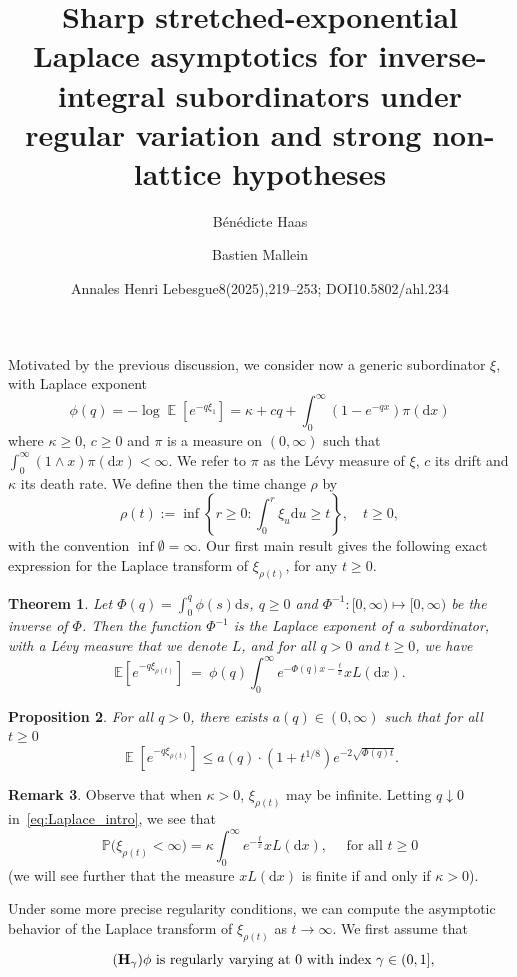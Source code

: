 \documentclass[10pt]{amsart}
\title[Sharp inverse-integral subordinator asymptotics]{Sharp stretched-exponential Laplace asymptotics for inverse-integral subordinators under regular variation and strong non-lattice hypotheses}
\author{B\'en\'edicte Haas}
\author{Bastien Mallein}
\date{Annales Henri Lebesgue8(2025),219–253; DOI10.5802/ahl.234}
\newtheorem{theo}{Theorem}[section]
\newtheorem{prop}[theo]{Proposition}
\theoremstyle{definition}
\newtheorem{rema}[theo]{Remark}
\numberwithin{equation}{section}
\newcommand{\bbP}{\mathbb{P}}
\newcommand{\bbE}{\mathbb{E}}
\DeclareMathOperator{\E}{\mathbb{E}}
\newcommand{\dd}{\mathrm{d}}
\begin{document}
\maketitle
\setcounter{section}{1}
\setcounter{theo}{1}
\setcounter{equation}{6}
Motivated by the previous discussion, we consider now a generic subordinator $\xi$, with Laplace exponent
\[
\phi(q)=-\log \E\left[e^{-q \xi_1}\right] = \kappa + c q + \int_0^\infty (1 - e^{-qx}) \pi(\dd x)
\]
where $\kappa \geq 0$, $c \geq 0$ and $\pi$ is a measure on $(0,\infty)$ such that $\int_0^{\infty} (1 \wedge x) \pi(\dd x) < \infty$. We refer to $\pi$ as the Lévy measure of $\xi$, $c$ its drift and $\kappa$ its death rate. We define then the time change $\rho$ by
\[
\rho(t) := \inf \left\{ r \geq 0 : \int_0^r \xi_u \dd u \geq t \right\}, \quad t \geq 0,
\]
with the convention $\inf{\emptyset}=\infty$. Our first main result gives the following exact expression for the Laplace transform of $\xi_{\rho(t)}$, for any $t\geq 0$.
\begin{theo}\label{thm:lapTransform}
Let $\Phi(q)=\int_0^q \phi(s) \dd s$, $q \geq 0$ and $\Phi^{-1}: [0,\infty) \mapsto [0,\infty)$ be the inverse of $\Phi$. Then the function $\Phi^{-1}$ is the Laplace exponent of a subordinator, with a Lévy measure that we denote $L$, and for all $q > 0$ and $t \geq 0$, we have
\begin{equation}\label{eq:Laplace_intro}
\bbE\left[e^{-q\xi_{\rho(t)}}\right]~=~\phi(q)\int_0^{\infty} e^{-\Phi(q)x-\frac{t}{x}} xL(\dd x).
\end{equation}
\end{theo}
\begin{prop}\label{prop:unifBound}
For all $q > 0$, there exists $a(q) \in (0,\infty)$ such that for all $t \geq 0$
\[
\E\left[e^{-q \xi_{\rho(t)}} \right] \leq a(q) \cdot \left(1+t^{1/8}\right) e^{-2 \sqrt{\Phi(q)t}}.
\]
\end{prop}
\begin{rema}
Observe that when $\kappa>0$, $\xi_{\rho(t)}$ may be infinite. Letting $q \downarrow 0$ in~\eqref{eq:Laplace_intro}, we see that
\[
\bbP\big(\xi_{\rho(t)}<\infty\big)=\kappa \int_0^{\infty}e^{-\frac{t}{x}} xL(\dd x), \quad \text{ for all } t \geq 0
\]
(we will see further that the measure $xL(\dd x)$ is finite if and only if $\kappa>0$).
\end{rema}
Under some more precise regularity conditions, we can compute the asymptotic behavior of the Laplace transform of $\xi_{\rho(t)}$ as $t \to \infty$. We first assume that
\begin{equation}\label{hyp:rv}
\tag{$\mathbf{H_{\gamma}}$}
\phi \text{ is regularly varying at 0 with index }\gamma \in (0,1],
\end{equation}
\end{document}
